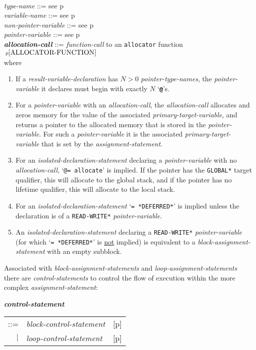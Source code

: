 \documentclass[12pt]{article}
\newcommand{\TT}[1]{{\tt \bfseries #1}}
\newcommand{\emkey}[1]{{\em \bfseries #1}}
\newcommand{\pagref}[1]{p\pageref{#1}}
\newcommand{\pagnote}[1]{$\,^{p\pageref{#1}}$}
\newenvironment{indpar}[1][0.3in]%
	{\begin{list}{}%
		     {\setlength{\itemsep}{0in}%
		      \setlength{\topsep}{0in}%
		      \setlength{\parsep}{1ex}%
		      \setlength{\labelwidth}{#1}%
		      \setlength{\leftmargin}{#1}%
		      \addtolength{\leftmargin}{\labelsep}}%
	 \item}%
	{\end{list}}
\begin{document}
\begin{indpar}
\\[0.5ex]
{\em type-name} ::= see \pagref{TYPE-NAME}
\\[0.5ex]
{\em variable-name} ::= see \pagref{VARIABLE-NAME}
\\[0.5ex]
{\em non-pointer-variable} ::= see \pagref{NON-POINTER-VARIABLE}
\\[0.5ex]
{\em pointer-variable} ::= see \pagref{POINTER-VARIABLE}
\\[0.5ex]
\emkey{allocation-call}\label{ALLOCATION-CALL} ::=
    {\em function-call} to
    an {\tt allocator} function\pagnote{ALLOCATOR-FUNCTION}
\\[2ex]
where
\begin{enumerate}
\item If a {\em result-variable-declaration}
has $N>0$ {\em pointer-type-names}, the {\em pointer-variable}
it declares must begin with exactly $N$ `\TT{@}'s.
\item For a {\em pointer-variable} with an {\em allocation-call},
the {\em allocation-call} allocates and zeros memory for the value of the
associated {\em primary-target-variable}, and returns a pointer to the
allocated memory that is stored in the {\em pointer-variable}.
For such a {\em pointer-variable} it is the
associated {\em primary-target-variable}
that is set by the {\em assignment-statement}.
\item For an {\em isolated-declaration-statement} declaring a
{\em pointer-variable} with no {\em alloca\-tion-call},
`{\tt @= allocate}' is implied.  If the pointer has the {\tt *GLOBAL*}
target qualifier, this will allocate to the global stack, and if
the pointer has no lifetime qualifier, this will allocate to the local stack.
\item For an {\em isolated-declaration-statement} `{\tt = *DEFERRED*}'
is implied unless the declaration is of a {\tt *READ-WRITE*}
{\em pointer-variable}.
\item An {\em isolated-declaration-statement} declaring a
{\tt *READ-WRITE*} {\em pointer-variable} (for which
`{\tt = *DEFERRED*}' is \underline{not} implied) is equivalent
to a {\em block-assignment-statement} with an empty subblock.
\end{enumerate}

\end{indpar}

Associated with {\em block-assignment-statements} and
{\em loop-assignment-statements}
there are {\em con\-trol-statements}
to control the flow of execution within the more complex
{\em assignment-state\-ment}:
\begin{indpar}
\emkey{control-statement}\label{CONTROL-STATEMENT}
    \begin{tabular}[t]{@{}rll}
    ::= & {\em block-control-statement}
        & [\pagref{BLOCK-CONTROL-STATEMENT}] \\
    $|$ & {\em loop-control-statement}
        & [\pagref{LOOP-CONTROL-STATEMENT}] \\
    \end{tabular}
\end{indpar}
\end{document}
